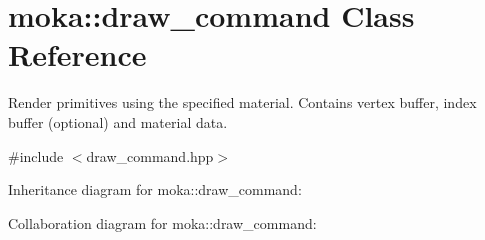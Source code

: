 \hypertarget{classmoka_1_1draw__command}{}\section{moka\+::draw\+\_\+command Class Reference}
\label{classmoka_1_1draw__command}


Render primitives using the specified material. Contains vertex buffer, index buffer (optional) and material data.  




{\ttfamily \#include $<$draw\+\_\+command.\+hpp$>$}



Inheritance diagram for moka\+::draw\+\_\+command\+:


Collaboration diagram for moka\+::draw\+\_\+command\+:
